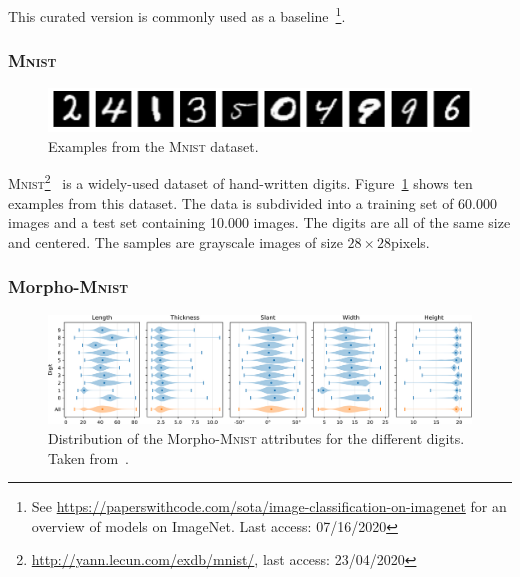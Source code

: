 This curated version is commonly used as a baseline~\citep{krizhevsky2012imagenet,Szegedy_2015_CVPR}\footnote{See \href{https://paperswithcode.com/sota/image-classification-on-imagenet}{https://paperswithcode.com/sota/image-classification-on-imagenet} for an overview of models on ImageNet. Last access: 07/16/2020}.

\subsubsection{\textsc{Mnist}}\label{subsubsec:mnist}

\begin{figure}
    \begin{center}
        \includegraphics[width=\textwidth]{images/mnist_sample.png}
    \end{center}
    \caption[\textsc{Mnist} dataset example images]{Examples from the \textsc{Mnist} dataset.}
    \label{fig:mnist_sample}
\end{figure}

\textsc{Mnist}\footnote{\href{http://yann.lecun.com/exdb/mnist/}{http://yann.lecun.com/exdb/mnist/}, last access: 23/04/2020}~\citep{lecun1998gradient} is a widely-used dataset of hand-written digits.
Figure~\ref{fig:mnist_sample} shows ten examples from this dataset.
The data is subdivided into a training set of 60.000 images and a test set containing 10.000 images.
The digits are all of the same size and centered.
The samples are grayscale images of size $28\times 28$pixels.

\subsubsection{Morpho-\textsc{Mnist}}\label{subsubsec:morphomnist}

\begin{figure}[H]
    \centering
    \includegraphics[width=\textwidth]{images/morpho_mnist_distribution.png}
    \caption[Morpho-\textsc{Mnist} distribution]{Distribution of the Morpho-\textsc{Mnist} attributes for the different digits. Taken from~\citep{castro2019morpho}.}
    \label{fig:morpho_mnist_distribution}
\end{figure}

